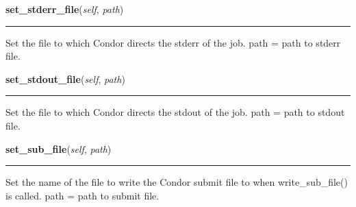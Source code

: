     \label{pipeline:CondorJob:set_stderr_file}
    \vspace{0.5ex}

    \noindent\begin{boxedminipage}{\textwidth}

    \raggedright \textbf{set\_stderr\_file}(\textit{self}, \textit{path})

    \vspace{-1.5ex}

    \rule{\textwidth}{0.5\fboxrule}
    Set the file to which Condor directs the stderr of the job. path = 
    path to stderr file.

    \vspace{1ex}

    \end{boxedminipage}

    \label{pipeline:CondorJob:set_stdout_file}
    \vspace{0.5ex}

    \noindent\begin{boxedminipage}{\textwidth}

    \raggedright \textbf{set\_stdout\_file}(\textit{self}, \textit{path})

    \vspace{-1.5ex}

    \rule{\textwidth}{0.5\fboxrule}
    Set the file to which Condor directs the stdout of the job. path = 
    path to stdout file.

    \vspace{1ex}

    \end{boxedminipage}

    \label{pipeline:CondorJob:set_sub_file}
    \vspace{0.5ex}

    \noindent\begin{boxedminipage}{\textwidth}

    \raggedright \textbf{set\_sub\_file}(\textit{self}, \textit{path})

    \vspace{-1.5ex}

    \rule{\textwidth}{0.5\fboxrule}
    Set the name of the file to write the Condor submit file to when 
    write\_sub\_file() is called. path = path to submit file.

    \vspace{1ex}

    \end{boxedminipage}

